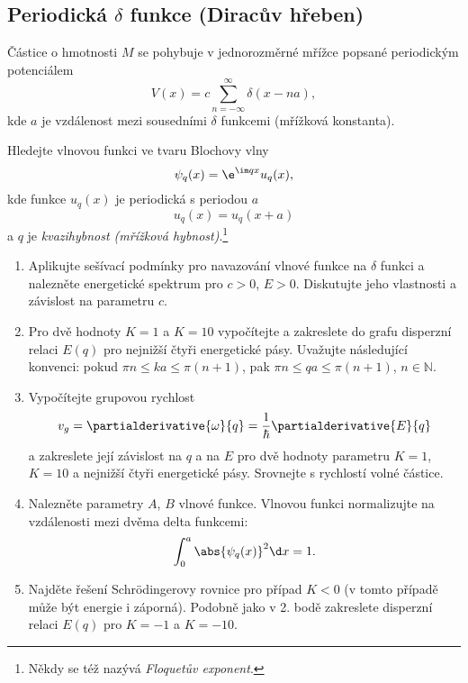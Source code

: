 \subsection{Periodická $\delta$ funkce (Diracův hřeben)}\label{sec:DiracComb}
Částice o hmotnosti $M$ se pohybuje v jednorozměrné mřížce popsané periodickým potenciálem
\begin{equation}
    V(x)=c\sum_{n=-\infty}^{\infty}\delta(x-na),
\end{equation}
kde $a$ je vzdálenost mezi sousedními $\delta$ funkcemi (mřížková konstanta).

Hledejte vlnovou funkci ve tvaru Blochovy vlny 
\begin{equation}
    \psi_{q}(x)=\e^{\im q x}u_{q}(x),
    \label{eq:BlochWave}
\end{equation}
kde funkce $u_{q}(x)$ je periodická s periodou $a$
\begin{equation}
    u_{q}(x)=u_{q}(x+a)
    \label{eq:BlochTheorem}
\end{equation}
a $q$ je \emph{kvazihybnost (mřížková hybnost)}.\footnote{
    Někdy se též nazývá \emph{Floquetův exponent}.
}

\begin{enumerate}
\item
    Aplikujte sešívací podmínky pro navazování vlnové funkce na $\delta$ funkci a nalezněte energetické spektrum pro $c>0$, $E>0$.
    Diskutujte jeho vlastnosti a závislost na parametru $c$.

\item 
    Pro dvě hodnoty $K=1$ a $K=10$ vypočítejte a zakreslete do grafu disperzní relaci $E(q)$ pro nejnižší čtyři energetické pásy.
    Uvažujte následující konvenci: pokud $\pi n\leq ka\leq\pi(n+1)$, pak $\pi n\leq qa\leq\pi(n+1)$, $n\in\mathbb{N}$.

\item
    Vypočítejte grupovou rychlost
    \begin{equation}\label{eq:DiracCombGroupVelocity}
        v_{g}=\partialderivative{\omega}{q}
             =\frac{1}{\hbar}\partialderivative{E}{q}
    \end{equation}	
    a zakreslete její závislost na $q$ a na $E$ pro dvě hodnoty parametru $K=1$, $K=10$ a nejnižší čtyři energetické pásy.
    Srovnejte s rychlostí volné částice.

\item 
    Nalezněte parametry $A$, $B$ vlnové funkce. Vlnovou funkci normalizujte na vzdálenosti mezi dvěma delta funkcemi:
    \begin{equation}\label{eq:DiracCombWaveFunctionNormalization}
        \int_{0}^{a}\abs{\psi_{q}(x)}^{2}\d x=1.
    \end{equation}

\item
    Najděte řešení Schrödingerovy rovnice pro případ $K<0$ (v tomto případě může být energie i záporná).
    Podobně jako v 2. bodě zakreslete disperzní relaci $E(q)$ pro $K=-1$ a $K=-10$.

\end{enumerate}

